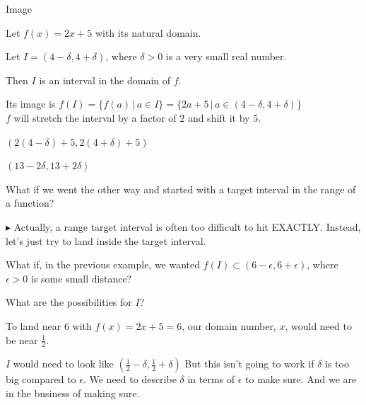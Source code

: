 \documentclass{ximera}
\begin{document}
\begin{example} Image

Let $f(x) = 2x + 5$ with its natural domain.

Let  $I = (4-\delta, 4+\delta)$, where $\delta > 0$ is a very small real number.

Then $I$ is an interval in the domain of $f$.


Its image is $f(I) = \{   f(a)  \, | \, a \in I \}  = \{   2a+5  \, | \, a \in (4-\delta, 4+\delta) \}$  \\



$f$ will stretch the interval by a factor of $2$ and shift it by $5$.


$(2(4-\delta)+5, 2(4+\delta)+5)$


$(13-2\delta, 13+2\delta)$






\end{example}













What if we went the other way and started with a target interval in the range of a function? 

\textbf{\textcolor{red!70!darkgray}{$\blacktriangleright$}} Actually, a range target interval is often too difficult to hit EXACTLY.  Instead, let's just try to land inside the target interval. 



What if, in the previous example, we wanted $f(I) \subset (6-\epsilon, 6+\epsilon)$, where $\epsilon > 0$ is some small distance?  


What are the possibilities for $I$?  







To land near $6$ with $f(x) = 2x + 5 = 6$, our domain number, $x$, would need to be near $\frac{1}{2}$.  

$I$ would need to look like $\left( \frac{1}{2} - \delta, \frac{1}{2}+ \delta \right)$  But this isn't going to work if $\delta$ is too big compared to $\epsilon$.  We need to describe $\delta$ in terms of $\epsilon$ to make sure.  And we are in the business of making sure. 
\end{document}
